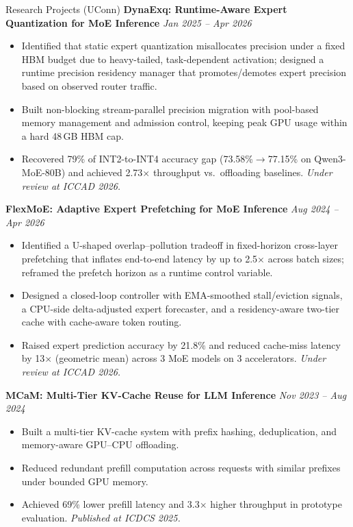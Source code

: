 \documentclass[]{resume}
\begin{document}
\begin{rSection}{Research Projects (UConn)}
\vspace{0.5ex}
\textbf{DynaExq: Runtime-Aware Expert Quantization for MoE Inference} \hfill \textit{Jan 2025 -- Apr 2026}
\begin{itemize}[leftmargin=1.2em, itemsep=0.2em, topsep=0.2em]
    \item Identified that static expert quantization misallocates precision under a fixed HBM budget due to heavy-tailed, task-dependent activation; designed a runtime precision residency manager that promotes/demotes expert precision based on observed router traffic.
    \item Built non-blocking stream-parallel precision migration with pool-based memory management and admission control, keeping peak GPU usage within a hard 48\,GB HBM cap.
    \item Recovered 79\% of INT2-to-INT4 accuracy gap (73.58\%$\to$77.15\% on Qwen3-MoE-80B) and achieved 2.73$\times$ throughput vs.\ offloading baselines. \textit{Under review at ICCAD 2026.}
\end{itemize}

\vspace{0.5ex}
\textbf{FlexMoE: Adaptive Expert Prefetching for MoE Inference} \hfill \textit{Aug 2024 -- Apr 2026}
\begin{itemize}[leftmargin=1.2em, itemsep=0.2em, topsep=0.2em]
    \item Identified a U-shaped overlap--pollution tradeoff in fixed-horizon cross-layer prefetching that inflates end-to-end latency by up to 2.5$\times$ across batch sizes; reframed the prefetch horizon as a runtime control variable.
    \item Designed a closed-loop controller with EMA-smoothed stall/eviction signals, a CPU-side delta-adjusted expert forecaster, and a residency-aware two-tier cache with cache-aware token routing.
    \item Raised expert prediction accuracy by 21.8\% and reduced cache-miss latency by 13$\times$ (geometric mean) across 3 MoE models on 3 accelerators. \textit{Under review at ICCAD 2026.}
\end{itemize}

\vspace{0.5ex}
\textbf{MCaM: Multi-Tier KV-Cache Reuse for LLM Inference} \hfill \textit{Nov 2023 -- Aug 2024}
\begin{itemize}[leftmargin=1.2em, itemsep=0.2em, topsep=0.2em]
    \item Built a multi-tier KV-cache system with prefix hashing, deduplication, and memory-aware GPU--CPU offloading.
    \item Reduced redundant prefill computation across requests with similar prefixes under bounded GPU memory.
    \item Achieved 69\% lower prefill latency and 3.3$\times$ higher throughput in prototype evaluation. \textit{Published at ICDCS 2025.}
\end{itemize}

\end{rSection}
\end{document}
